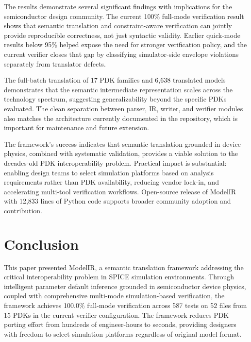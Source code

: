 \documentclass[10pt,twocolumn]{article}
\begin{document}
The results demonstrate several significant findings with implications for the semiconductor design community. The current 100\% full-mode verification result shows that semantic translation and constraint-aware verification can jointly provide reproducible correctness, not just syntactic validity. Earlier quick-mode results below 95\% helped expose the need for stronger verification policy, and the current verifier closes that gap by classifying simulator-side envelope violations separately from translator defects.

The full-batch translation of 17 PDK families and 6,638 translated models demonstrates that the semantic intermediate representation scales across the technology spectrum, suggesting generalizability beyond the specific PDKs evaluated. The clean separation between parser, IR, writer, and verifier modules also matches the architecture currently documented in the repository, which is important for maintenance and future extension.

The framework's success indicates that semantic translation grounded in device physics, combined with systematic validation, provides a viable solution to the decades-old PDK interoperability problem. Practical impact is substantial: enabling design teams to select simulation platforms based on analysis requirements rather than PDK availability, reducing vendor lock-in, and accelerating multi-tool verification workflows. Open-source release of ModelIR with 12,833 lines of Python code supports broader community adoption and contribution.

\section{Conclusion}

This paper presented ModelIR, a semantic translation framework addressing the critical interoperability problem in SPICE simulation environments. Through intelligent parameter default inference grounded in semiconductor device physics, coupled with comprehensive multi-mode simulation-based verification, the framework achieves 100.0\% full-mode verification across 587 tests on 52 files from 15 PDKs in the current verifier configuration. The framework reduces PDK porting effort from hundreds of engineer-hours to seconds, providing designers with freedom to select simulation platforms regardless of original model format.
\end{document}
